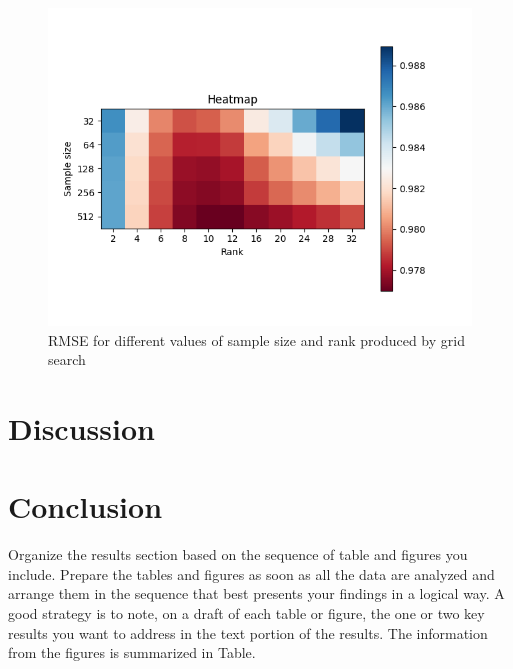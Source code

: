 \documentclass[10pt,conference,compsocconf]{IEEEtran}
\begin{document}
    \begin{figure}
        \includegraphics[width=\columnwidth]{figures/heatmap.png}
        \caption{RMSE for different values of sample size and rank produced by grid search}
        \label{fig:Heatmap}
    \end{figure}


    \section{Discussion}


    \section{Conclusion}

    Organize the results section based on the sequence of table and
    figures you include. Prepare the tables and figures as soon as all
    the data are analyzed and arrange them in the sequence that best
    presents your findings in a logical way. A good strategy is to note,
    on a draft of each table or figure, the one or two key results you
    want to address in the text portion of the results.
    The information from the figures is
    summarized in Table.




    \balance
    
    
\end{document}
